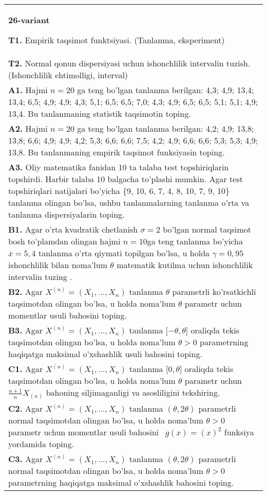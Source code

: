 \documentclass{article}
\begin{document}
\begin{tabular}{m{17cm}}
\textbf{26-variant}
\newline

\textbf{T1.} 
Empirik taqsimot funktsiyasi. (Tanlanma, eksperiment)
\\
\textbf{T2.} 
Normal qonun dispersiyasi uchun ishonchlilik intervalin tuzish. (Ishonchlilik ehtimolligi, interval)
\\
\textbf{A1.} 
Hajmi \(n = 20\) ga teng bo'lgan tanlanma berilgan: 4,3; 4,9; 13,4; 13,4; 6,5; 4,9; 4,9; 4,3; 5,1; 6,5; 6,5; 7,0; 4,3; 4,9; 6,5; 6,5; 5,1; 5,1; 4,9; 13,4. Bu tanlanmaning statistik taqsimotin toping.
\\
\textbf{A2.} 
Hajmi \(n = 20\) ga teng bo'lgan tanlanma berilgan: 4,2; 4,9; 13,8; 13,8; 6,6; 4,9; 4,9; 4,2; 5,3; 6,6; 6,6; 7,5; 4,2; 4,9; 6,6; 6,6; 5,3; 5,3; 4,9; 13,8. Bu tanlanmaning empirik taqsimot funksiyasin toping.
\\
\textbf{A3.} 
Oliy matematika fanidan 10 ta talaba test topshiriqlarin topshirdi. Harbir talaba 10 balgacha to'plashi mumkin. Agar test topshiriqlari natijalari bo'yicha \{9, 10, 6, 7, 4, 8, 10, 7, 9, 10\} tanlanma olingan bo'lsa, ushbu tanlanmalarning tanlanma o'rta va tanlanma dispersiyalarin toping.
\\
\textbf{B1.} 
Agar o'rta kvadratik chetlanish \(\sigma = 2\) bo'lgan normal taqsimot bosh to'plamdan olingan hajmi \(n = 10\)ga teng tanlanma bo'yicha \(\overline{x} = 5,4\) tanlanma o'rta qiymati topilgan bo'lsa, u holda \(\gamma = 0,95\) ishonchlilik bilan noma'lum \(\theta\) matematik kutilma uchun ishonchlilik intervalin tuzing .
\\
\textbf{B2.} 
Agar \(X^{(n)} = \left( X_{1},...,X_{n} \right)\) tanlanma \(\theta\) parametrli ko'rsatkichli taqsimotdan olingan bo'lsa, u holda noma'lum \(\theta\) parametr uchun momentlar usuli bahosini toping.
\\
\textbf{B3.} 
Agar \(X^{(n)} = \left( X_{1},...,X_{n} \right)\) tanlanma \(\lbrack - \theta,\theta\rbrack\) oraliqda tekis taqsimotdan olingan bo'lsa, u holda noma'lum \(\theta > 0\) parametrning haqiqatga maksimal o'xshashlik usuli bahosini toping.
\\
\textbf{C1.} 
Agar \(X^{(n)} = \left( X_{1},...,X_{n} \right)\) tanlanma \(\lbrack 0,\theta\rbrack\) oraliqda tekis taqsimotdan olingan bo'lsa, u holda noma'lum \(\theta\) parametr uchun \(\frac{n + 1}{n}X_{(n)}\) bahoning siljimaganligi va asosliligini tekshiring.
\\
\textbf{C2.} 
Agar \(X^{(n)} = \left( X_{1},...,X_{n} \right)\) tanlanma \((\theta,2\theta)\) parametrli normal taqsimotdan olingan bo'lsa, u holda noma'lum \(\theta > 0\) parametr uchun momentlar usuli bahosini \(\ \ g(x) = (x)^{2}\) funksiya yordamida toping.
\\
\textbf{C3.} 
Agar \(X^{(n)} = \left( X_{1},...,X_{n} \right)\) tanlanma \((\theta,2\theta)\) parametrli normal taqsimotdan olingan bo'lsa, u holda noma'lum \(\theta > 0\) parametrning haqiqatga maksimal o'xshashlik bahosini toping.
\\

\end{tabular}
\vspace{1cm}
\end{document}
